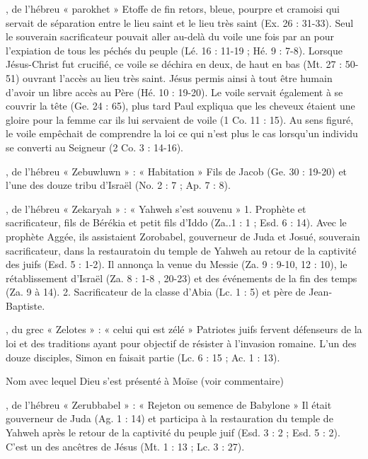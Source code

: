 \begin{multicols}{2}
, de l'hébreu « parokhet »
Etoffe de fin retors, bleue, pourpre et cramoisi qui servait de séparation entre le lieu saint et le lieu très saint (Ex. 26 : 31-33). Seul le souverain sacrificateur pouvait aller au-delà du voile une fois par an pour l'expiation de tous les péchés du peuple (Lé. 16 : 11-19 ; Hé. 9 : 7-8). Lorsque Jésus-Christ fut crucifié, ce voile se déchira en deux, de haut en bas (Mt. 27 : 50-51) ouvrant l'accès au lieu très saint. Jésus permis ainsi à tout être humain d'avoir un libre accès au Père (Hé. 10 : 19-20).
Le voile servait également à se couvrir la tête (Ge. 24 : 65), plus tard Paul expliqua que les cheveux étaient une gloire pour la femme car ils lui servaient de voile (1 Co. 11 : 15). Au sens figuré, le voile empêchait de comprendre la loi ce qui n'est plus le cas lorsqu'un individu se converti au Seigneur (2 Co. 3 : 14-16).


, de l'hébreu « Zebuwluwn » : « Habitation »
Fils de Jacob (Ge. 30 : 19-20) et l'une des douze tribu d'Israël (No. 2 : 7 ; Ap. 7 : 8).


, de l'hébreu « Zekaryah » : « Yahweh s'est souvenu »
1. Prophète et sacrificateur, fils de Bérékia et petit fils d'Iddo (Za..1 : 1 ; Esd. 6 : 14). Avec le prophète Aggée, ils assistaient Zorobabel, gouverneur de Juda et Josué, souverain sacrificateur, dans la restauratoin du temple de Yahweh au retour de la captivité des juifs (Esd. 5 : 1-2). Il annonça la venue du Messie (Za. 9 : 9-10, 12 : 10), le rétablissement d'Israël (Za. 8 : 1-8 , 20-23) et des événements de la fin des temps (Za. 9 à 14).
2. Sacrificateur de la classe d'Abia (Lc. 1 : 5) et père de Jean-Baptiste.


, du grec « Zelotes » : « celui qui est zélé »
Patriotes juifs fervent défenseurs de la loi et des traditions ayant pour objectif de résister à l'invasion romaine. L'un des douze disciples, Simon en faisait partie (Lc. 6 : 15 ; Ac. 1 : 13).


Nom avec lequel Dieu s'est présenté à Moïse (voir commentaire)


, de l'hébreu « Zerubbabel » : « Rejeton ou semence de Babylone »
Il était gouverneur de Juda (Ag. 1 : 14) et participa à la restauration du temple de Yahweh après le retour de la captivité du peuple juif (Esd. 3 : 2 ; Esd. 5 : 2). C'est un des ancêtres de Jésus (Mt. 1 : 13 ; Lc. 3 : 27).


\end{multicols}
